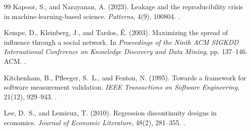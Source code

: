 \begin{thebibliography}{99}
Kapoor, S., and Narayanan, A. (2023).
Leakage and the reproducibility crisis in machine-learning-based science.
\emph{Patterns}, 4(9), 100804.
.

Kempe, D., Kleinberg, J., and Tardos, \'E. (2003).
Maximizing the spread of influence through a social network.
In \emph{Proceedings of the Ninth ACM SIGKDD International Conference on Knowledge Discovery and Data Mining}, pp. 137--146. ACM.
.

Kitchenham, B., Pfleeger, S.~L., and Fenton, N. (1995).
Towards a framework for software measurement validation.
\emph{IEEE Transactions on Software Engineering}, 21(12), 929--943.
.

Lee, D.~S., and Lemieux, T. (2010).
Regression discontinuity designs in economics.
\emph{Journal of Economic Literature}, 48(2), 281--355.
.

\end{thebibliography}
\clearpage
\begingroup
\renewcommand{\bibsection}{\section*{References\enspace{\normalfont\sffamily\fontsize{11}{14}\selectfont continued}}}
